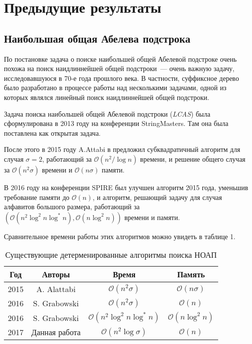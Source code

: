 \section{Предыдущие результаты}
\subsection{Наибольшая общая Абелева подстрока}
По постановке задача о поиске наибольшей общей Абелевой подстроке очень похожа на поиск наидлиннейшей общей подстроки~--- очень важную задачу, исследовавшуюся в 70-е года прошлого века. В частности, суффиксное дерево было разработано в процессе работы над несколькими задачами, одной из которых являлся линейный поиск наидлиннейшей общей подстроки.

Задача поиска наибольшей общей Абелевой подстроки (\textit{LCAS}) была сформулирована в 2013 году на конференции StringMasters. Там она была поставлена как открытая задача. 

После этого в 2015 году A.Attabi в \cite{1} предложил субквадратичный алгоритм для случая $\sigma=2$, работающий за $\mathcal{O}(n^2/\log n)$ времени, и решение общего случая за $\mathcal{O}(n^2\sigma)$ времени и $\mathcal{O}(n\sigma)$ памяти.

В 2016 году на конференции SPIRE \cite{4} был улучшен алгоритм 2015 года, уменьшив требование памяти до $\mathcal{O}(n)$, и алгоритм, решающий задачу для случая алфавитов большого размера, работающий за $(\mathcal{O}(n^2 \log^2 n \log^* n), \mathcal{O}(n \log^2 n))$ времени и памяти. 

Сравнительное времени работы этих алгоритмов можно увидеть в таблице 1.

\begin{table}[H]
\begin{center}
\begin{tabular}{|c|c|c|c|}
\hline
Год & Авторы & Время & Память \\
\hline
2015 & A. Alattabi & $\mathcal{O}(n^2 \sigma)$ & $\mathcal{O}(n \sigma)$ \\
\hline
2016 & S. Grabowski & $\mathcal{O}(n^2 \sigma)$ & $\mathcal{O}(n)$ \\
\hline
2016 & S. Grabowski & $\mathcal{O}(n^2 \log^2 n \log^* n)$ & $\mathcal{O}(n \log^2 n)$ \\
\hline
2017 & Данная работа & $\mathcal{O}(n^2 \log \sigma)$ & $\mathcal{O}(n)$ \\
\hline
\end{tabular}
\end{center}
\caption{Существующие детерменированные алгоритмы поиска НОАП}
\end{table}

